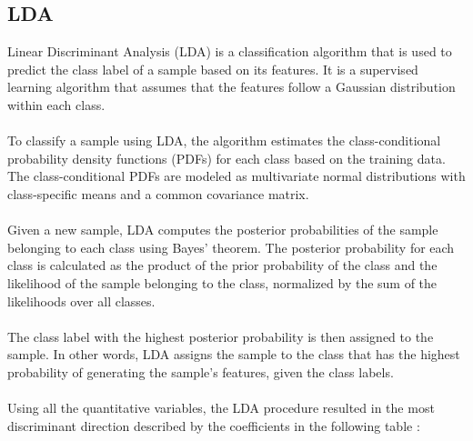 \subsection{LDA}
Linear Discriminant Analysis (LDA) is a classification algorithm that is used to predict the class label of a sample based on its features. It is a supervised learning algorithm that assumes that the features follow a Gaussian distribution within each class.
\\\\
To classify a sample using LDA, the algorithm estimates the class-conditional probability density functions (PDFs) for each class based on the training data. The class-conditional PDFs are modeled as multivariate normal distributions with class-specific means and a common covariance matrix.
\\\\
Given a new sample, LDA computes the posterior probabilities of the sample belonging to each class using Bayes' theorem. The posterior probability for each class is calculated as the product of the prior probability of the class and the likelihood of the sample belonging to the class, normalized by the sum of the likelihoods over all classes.
\\\\
The class label with the highest posterior probability is then assigned to the sample. In other words, LDA assigns the sample to the class that has the highest probability of generating the sample's features, given the class labels.
\\\\
Using all the quantitative variables, the LDA procedure
resulted in the most discriminant direction described by the coefficients in the following table :
